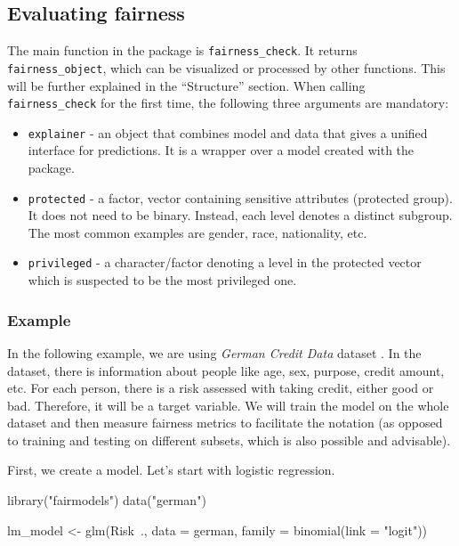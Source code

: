 \hypertarget{evaluating-fairness}{%
\subsection{Evaluating fairness}\label{evaluating-fairness}}

The main function in the  package is
\texttt{fairness\_check}. It returns \texttt{fairness\_object}, which
can be visualized or processed by other functions. This will be further
explained in the ``Structure'' section. When calling
\texttt{fairness\_check} for the first time, the following three
arguments are mandatory:

\begin{itemize}
\tightlist
\item
  \texttt{explainer} - an object that combines model and data that gives
  a unified interface for predictions. It is a wrapper over a model
  created with the  \citep{JMLRv19} package.
\item
  \texttt{protected} - a factor, vector containing sensitive attributes
  (protected group). It does not need to be binary. Instead, each level
  denotes a distinct subgroup. The most common examples are gender,
  race, nationality, etc.
\item
  \texttt{privileged} - a character/factor denoting a level in the
  protected vector which is suspected to be the most privileged one.
\end{itemize}

\hypertarget{example}{%
\subsubsection{Example}\label{example}}

In the following example, we are using \emph{German Credit Data} dataset
\citep{Dua2019}. In the dataset, there is information about people like
age, sex, purpose, credit amount, etc. For each person, there is a risk
assessed with taking credit, either good or bad. Therefore, it will be a
target variable. We will train the model on the whole dataset and then
measure fairness metrics to facilitate the notation (as opposed to
training and testing on different subsets, which is also possible and
advisable).

First, we create a model. Let's start with logistic regression.

\begin{Schunk}
\begin{Sinput}
library("fairmodels")
data("german")

lm_model <- glm(Risk~., data = german, family = binomial(link = "logit"))
\end{Sinput}
\end{Schunk}

